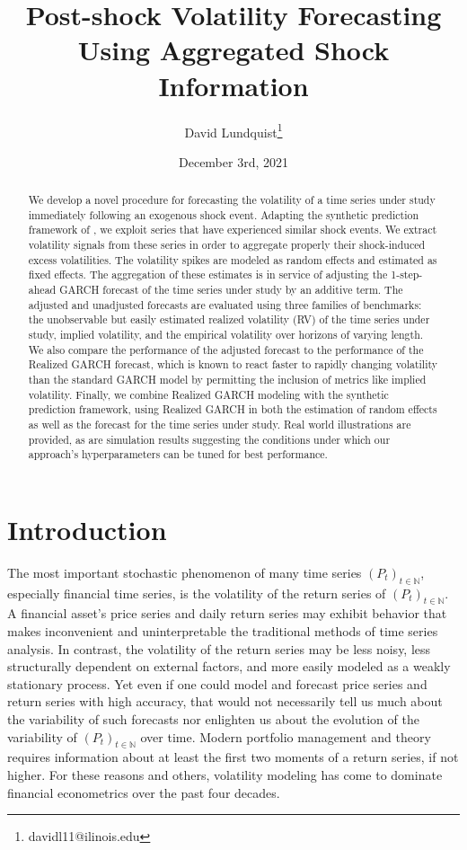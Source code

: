 \documentclass[11pt]{article}
\title{Post-shock Volatility Forecasting Using Aggregated Shock Information}
\author{David Lundquist\thanks{davidl11@ilinois.edu} }
\affil{Department of Statistics, University of Illinois at Urbana-Champaign}
\date{December 3rd, 2021}
\theoremstyle{definition}
\begin{document}
\maketitle

\begin{abstract}
We develop a novel procedure for forecasting the volatility of a time series under study immediately following an exogenous shock event.  Adapting the synthetic prediction framework of \citet{lin2021minimizing}, we exploit series that have experienced similar shock events.  We extract volatility signals from these series in order to aggregate properly their shock-induced excess volatilities.  The volatility spikes are modeled as random effects and estimated as fixed effects.  The aggregation of these estimates is in service of adjusting the 1-step-ahead GARCH forecast of the time series under study by an additive term.  The adjusted and unadjusted forecasts are evaluated using three families of benchmarks: the unobservable but easily estimated realized volatility (RV) of the time series under study, implied volatility, and the empirical volatility over horizons of varying length.  We also compare the performance of the adjusted forecast to the performance of the Realized GARCH forecast, which is known to react faster to rapidly changing volatility than the standard GARCH model by permitting the inclusion of metrics like implied volatility.   Finally, we combine Realized GARCH modeling with the synthetic prediction framework, using Realized GARCH in both the estimation of random effects as well as the forecast for the time series under study.  Real world illustrations are provided, as are simulation results suggesting the conditions under which our approach's hyperparameters can be tuned for best performance.
\end{abstract}


\section{Introduction}



The most important stochastic phenomenon of many time series $(P_{t})_{t\in\mathbb{N}}$, especially financial time series, is the volatility of the return series of $(P_{t})_{t\in\mathbb{N}}$.  A financial asset's price series and daily return series may exhibit behavior that makes inconvenient and uninterpretable the traditional methods of time series analysis.  In contrast, the volatility of the return series may be less noisy, less structurally dependent on external factors, and more easily modeled as a weakly stationary process.  Yet even if one could model and forecast price series and return series with high accuracy, that would not necessarily tell us much about the variability of such forecasts nor enlighten us about the evolution of the variability of $(P_{t})_{t\in\mathbb{N}}$ over time. Modern portfolio management and theory requires information about at least the first two moments of a return series, if not higher.  For these reasons and others, volatility modeling has come to dominate financial econometrics over the past four decades.  
\end{document}
